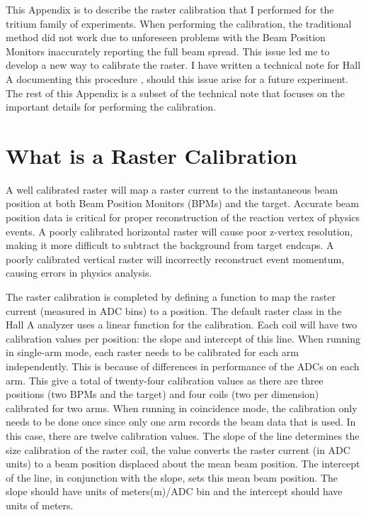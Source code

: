 This Appendix is to describe the raster calibration that I performed for the tritium family of experiments. When performing the calibration, the traditional method did not work due to unforeseen problems with the Beam Position Monitors inaccurately reporting the full beam spread. This issue led me to develop a new way to calibrate the raster. I have written a technical note for Hall A documenting this procedure \cite{MyRaster}, should this issue arise for a future experiment. The rest of this Appendix is a subset of the technical note that focuses on the important details for performing the calibration.

\section{What is a Raster Calibration} \label{what}

A well calibrated raster will map a raster current to the instantaneous beam position at both Beam Position Monitors (BPMs) and the target. Accurate beam position data is critical for proper reconstruction of the reaction vertex of physics events. A poorly calibrated horizontal raster will cause poor z-vertex resolution, making it more difficult to subtract the background from target endcaps. A poorly calibrated vertical raster will incorrectly reconstruct event momentum, causing errors in physics analysis.


The raster calibration is completed by defining a function to map the raster current (measured in ADC bins) to a position. The default raster class in the Hall A analyzer uses a linear function for the calibration. Each coil will have two calibration values per position: the slope and intercept of this line. When running in single-arm mode, each raster needs to be calibrated for each arm independently. This is because of differences in performance of the ADCs on each arm. This give a total of twenty-four calibration values as there are three positions (two BPMs and the target) and four coils (two per dimension) calibrated for two arms. When running in coincidence mode, the calibration only needs to be done once since only one arm records the beam data that is used. In this case, there are twelve calibration values. The slope of the line determines the size calibration of the raster coil, the value converts the raster current (in ADC units) to a beam position displaced about the mean beam position. The intercept of the line, in conjunction with the slope, sets this mean beam position. The slope should have units of meters(m)/ADC bin and the intercept should have units of meters.

